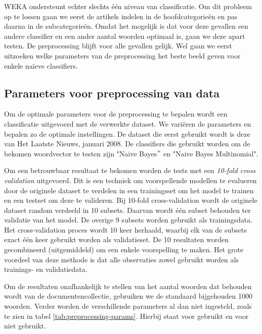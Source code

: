 WEKA ondersteunt echter slechts \'e\'en niveau van classificatie. Om dit probleem op te lossen gaan we eerst de artikels indelen in de hoofdcategorie\"en en pas daarna in de subcategorie\"en. Omdat het mogelijk is dat voor deze gevallen een andere classifier en een ander aantal woorden optimaal is, gaan we deze apart testen. De preprocessing blijft voor alle gevallen gelijk. Wel gaan we eerst uitzoeken welke parameters van de preprocessing het beste beeld geven voor enkele na\"ieve classifiers. 

\subsection{Parameters voor preprocessing van data}

Om de optimale parameters voor de preprocessing te bepalen wordt een classificatie uitgevoerd met de verwerkte dataset. We vari\"eren de parameters en bepalen zo de optimale instellingen. De dataset die eerst gebruikt wordt is deze van Het Laatste Nieuws, januari 2008. De classifiers die gebruikt worden om de bekomen woordvector te testen zijn "Naive Bayes$"$ en "Naive Bayes Multinomial". 

Om een betrouwbaar resultaat te bekomen worden de tests met een \textit{10-fold cross validation}\label{10-fold-cv} uitgevoerd. Dit is een techniek om voorspellende modellen te evalueren door de originele dataset te verdelen in een trainingsset om het model te trainen en een testset om deze te valideren. Bij 10-fold cross-validation\label{cross-val} wordt de originele dataset random verdeeld in 10 subsets. Daarvan wordt \'e\'en subset behouden ter validatie van het model. De overige 9 subsets worden gebruikt als trainingsdata. Het cross-validation proces wordt 10 keer herhaald, waarbij elk van de subsets exact \'e\'en keer gebruikt worden als validatieset. De 10 resultaten worden gecombineerd (uitgemiddeld) om een enkele voorspelling te maken. Het grote voordeel van deze methode is dat alle observaties zowel gebruikt worden als trainings- en validatiedata. 

Om de resultaten onafhankelijk te stellen van het aantal woorden dat behouden wordt van de documentencollectie, gebruiken we de standaard bijgehouden 1000 woorden. Verder worden de verschillende parameters al dan niet ingesteld, zoals te zien in tabel \ref{tab:preprocessing-params}. Hierbij staat  voor gebruikt en  voor niet gebruikt. 

